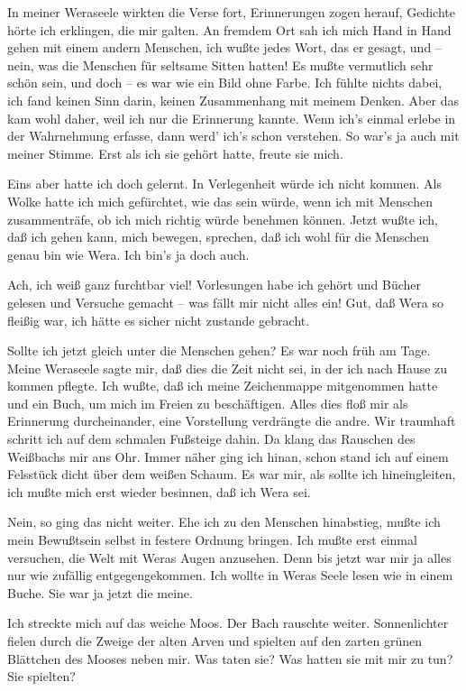 In meiner Weraseele wirkten die Verse fort, Erinnerungen zogen
herauf, Gedichte hörte ich erklingen, die mir galten. An fremdem
Ort sah ich mich Hand in Hand gehen mit einem andern Menschen, ich
wußte jedes Wort, das er gesagt, und – nein, was die Menschen für
seltsame Sitten hatten! Es mußte vermutlich sehr schön sein, und
doch – es war wie ein Bild ohne Farbe. Ich fühlte nichts dabei, ich
fand keinen Sinn darin, keinen Zusammenhang mit meinem Denken. Aber
das kam wohl daher, weil ich nur die Erinnerung kannte. Wenn ich's
einmal erlebe in der Wahrnehmung erfasse, dann werd' ich's schon
verstehen. So war's ja auch mit meiner Stimme. Erst als ich sie
gehört hatte, freute sie mich.

Eins aber hatte ich doch gelernt. In Verlegenheit würde ich nicht
kommen. Als Wolke hatte ich mich gefürchtet, wie das sein würde,
wenn ich mit Menschen zusammenträfe, ob ich mich richtig würde
benehmen können. Jetzt wußte ich, daß ich gehen kann, mich bewegen,
sprechen, daß ich wohl für die Menschen genau bin wie Wera. Ich
bin's ja doch auch.

Ach, ich weiß ganz furchtbar viel! Vorlesungen habe ich gehört und
Bücher gelesen und Versuche gemacht – was fällt mir nicht alles
ein! Gut, daß Wera so fleißig war, ich hätte es sicher nicht
zustande gebracht.

Sollte ich jetzt gleich unter die Menschen gehen? Es war noch früh
am Tage. Meine Weraseele sagte mir, daß dies die Zeit nicht sei, in
der ich nach Hause zu kommen pflegte. Ich wußte, daß ich meine
Zeichenmappe mitgenommen hatte und ein Buch, um mich im Freien zu
beschäftigen. Alles dies floß mir als Erinnerung durcheinander,
eine Vorstellung verdrängte die andre. Wir traumhaft schritt ich
auf dem schmalen Fußsteige dahin. Da klang das Rauschen des
Weißbachs mir ans Ohr. Immer näher ging ich hinan, schon stand ich
auf einem Felsstück dicht über dem weißen Schaum. Es war mir, als
sollte ich hineingleiten, ich mußte mich erst wieder besinnen, daß
ich Wera sei.

Nein, so ging das nicht weiter. Ehe ich zu den Menschen hinabstieg,
mußte ich mein Bewußtsein selbst in festere Ordnung bringen. Ich
mußte erst einmal versuchen, die Welt mit Weras Augen anzusehen.
Denn bis jetzt war mir ja alles nur wie zufällig entgegengekommen.
Ich wollte in Weras Seele lesen wie in einem Buche. Sie war ja
jetzt die meine.

Ich streckte mich auf das weiche Moos. Der Bach rauschte weiter.
Sonnenlichter fielen durch die Zweige der alten Arven und spielten
auf den zarten grünen Blättchen des Mooses neben mir. Was taten
sie? Was hatten sie mit mir zu tun? Sie spielten?

